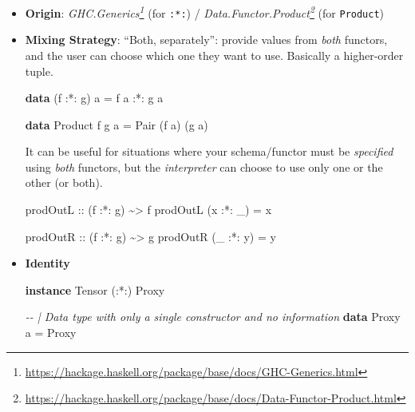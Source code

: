 \documentclass[]{article}
\newenvironment{Shaded}{}{}
\newcommand{\CommentTok}[1]{\textcolor[rgb]{0.38,0.63,0.69}{\textit{#1}}}
\newcommand{\DataTypeTok}[1]{\textcolor[rgb]{0.56,0.13,0.00}{#1}}
\newcommand{\KeywordTok}[1]{\textcolor[rgb]{0.00,0.44,0.13}{\textbf{#1}}}
\newcommand{\NormalTok}[1]{#1}
\newcommand{\OperatorTok}[1]{\textcolor[rgb]{0.40,0.40,0.40}{#1}}
\newcommand{\OtherTok}[1]{\textcolor[rgb]{0.00,0.44,0.13}{#1}}
\renewcommand{\href}[2]{#2\footnote{\url{#1}}}
\begin{document}
\begin{itemize}
\item
  \textbf{Origin}:
  \emph{\href{https://hackage.haskell.org/package/base/docs/GHC-Generics.html}{GHC.Generics}}
  (for \texttt{:*:}) /
  \emph{\href{https://hackage.haskell.org/package/base/docs/Data-Functor-Product.html}{Data.Functor.Product}}
  (for \texttt{Product})
\item
  \textbf{Mixing Strategy}: ``Both, separately'': provide values from
  \emph{both} functors, and the user can choose which one they want to use.
  Basically a higher-order tuple.

\begin{Shaded}
\begin{Highlighting}[]
\KeywordTok{data}\NormalTok{ (f }\OperatorTok{:*:}\NormalTok{ g) a }\OtherTok{=}\NormalTok{ f a }\OperatorTok{:*:}\NormalTok{ g a}

\KeywordTok{data} \DataTypeTok{Product}\NormalTok{ f g a }\OtherTok{=} \DataTypeTok{Pair}\NormalTok{ (f a) (g a)}
\end{Highlighting}
\end{Shaded}

  It can be useful for situations where your schema/functor must be
  \emph{specified} using \emph{both} functors, but the \emph{interpreter} can
  choose to use only one or the other (or both).

\begin{Shaded}
\begin{Highlighting}[]
\OtherTok{prodOutL ::}\NormalTok{ (f }\OperatorTok{:*:}\NormalTok{ g) }\OperatorTok{\textasciitilde{}>}\NormalTok{ f}
\NormalTok{prodOutL (x }\OperatorTok{:*:}\NormalTok{ \_) }\OtherTok{=}\NormalTok{ x}

\OtherTok{prodOutR ::}\NormalTok{ (f }\OperatorTok{:*:}\NormalTok{ g) }\OperatorTok{\textasciitilde{}>}\NormalTok{ g}
\NormalTok{prodOutR (\_ }\OperatorTok{:*:}\NormalTok{ y) }\OtherTok{=}\NormalTok{ y}
\end{Highlighting}
\end{Shaded}
\item
  \textbf{Identity}

\begin{Shaded}
\begin{Highlighting}[]
\KeywordTok{instance} \DataTypeTok{Tensor}\NormalTok{ (}\OperatorTok{:*:}\NormalTok{) }\DataTypeTok{Proxy}

\CommentTok{{-}{-} | Data type with only a single constructor and no information}
\KeywordTok{data} \DataTypeTok{Proxy}\NormalTok{ a }\OtherTok{=} \DataTypeTok{Proxy}
\end{Highlighting}
\end{Shaded}


\end{itemize}
\end{document}
